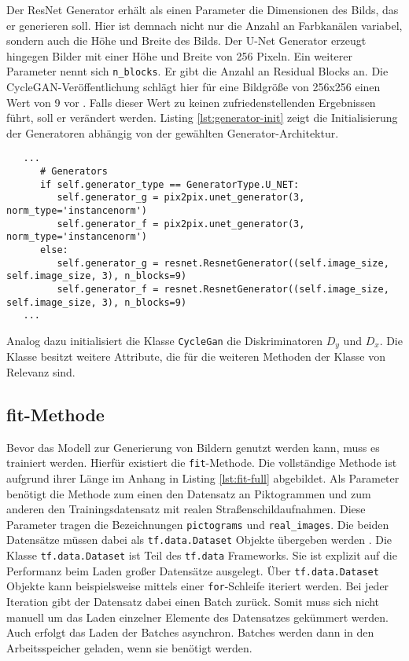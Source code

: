 Der ResNet Generator erhält als einen Parameter die Dimensionen des Bilds, das er generieren soll. Hier ist demnach nicht nur die Anzahl an Farbkanälen variabel, sondern auch die Höhe und Breite des Bilds. Der U-Net Generator erzeugt hingegen Bilder mit einer Höhe und Breite von 256 Pixeln. Ein weiterer Parameter nennt sich \texttt{n_blocks}. Er gibt die Anzahl an Residual Blocks an. Die \ac{CycleGAN}-Veröffentlichung schlägt hier für eine Bildgröße von 256x256 einen Wert von 9 vor \cite{cycleGAN}. Falls dieser Wert zu keinen zufriedenstellenden Ergebnissen führt, soll er verändert werden. Listing \ref{lst:generator-init} zeigt die Initialisierung der Generatoren abhängig von der gewählten Generator-Architektur.

\begin{code}
	\begin{verbatim}
   ...
      # Generators
      if self.generator_type == GeneratorType.U_NET:
         self.generator_g = pix2pix.unet_generator(3, norm_type='instancenorm')
         self.generator_f = pix2pix.unet_generator(3, norm_type='instancenorm')
      else:
         self.generator_g = resnet.ResnetGenerator((self.image_size, self.image_size, 3), n_blocks=9)
         self.generator_f = resnet.ResnetGenerator((self.image_size, self.image_size, 3), n_blocks=9)
   ...
   \end{verbatim}
   \label{lst:generator-init}
\end{code}

Analog dazu initialisiert die Klasse \texttt{CycleGan} die Diskriminatoren $D_y$ und $D_x$. Die Klasse besitzt weitere Attribute, die für die weiteren Methoden der Klasse von Relevanz sind.

\subsection{fit-Methode}
Bevor das Modell zur Generierung von Bildern genutzt werden kann, muss es trainiert werden. Hierfür existiert die \texttt{fit}-Methode. Die vollständige Methode ist aufgrund ihrer Länge im Anhang in Listing \ref{lst:fit-full} abgebildet. Als Parameter benötigt die Methode zum einen den Datensatz an Piktogrammen und zum anderen den Trainingsdatensatz mit realen Straßenschildaufnahmen. Diese Parameter tragen die Bezeichnungen \texttt{pictograms} und \texttt{real_images}. Die beiden Datensätze müssen dabei als \texttt{tf.data.Dataset} Objekte übergeben werden \cite{tf-dataset}. Die Klasse \texttt{tf.data.Dataset} ist Teil des \texttt{tf.data} Frameworks. Sie ist explizit auf die Performanz beim Laden großer Datensätze ausgelegt. Über \texttt{tf.data.Dataset} Objekte kann beispielsweise mittels einer \texttt{for}-Schleife iteriert werden. Bei jeder Iteration gibt der Datensatz dabei einen Batch zurück. Somit muss sich nicht manuell um das Laden einzelner Elemente des Datensatzes gekümmert werden. Auch erfolgt das Laden der Batches asynchron. Batches werden dann in den Arbeitsspeicher geladen, wenn sie benötigt werden. \cite{tf-dataset} 

